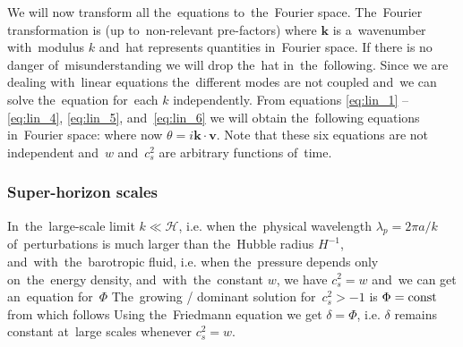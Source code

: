 We will now transform all the~equations to~the~Fourier space. The~Fourier transformation is (up to~non-relevant pre-factors)
where $\bm k$ is a~wavenumber with~modulus $k$ and~hat represents quantities in~Fourier space. If there is no danger of~misunderstanding we will drop the~hat in~the~following. Since we are dealing with~linear equations the~different modes are not coupled and~we can solve the~equation for~each $k$ independently.
 From equations \eqref{eq:lin_1} -- \eqref{eq:lin_4}, \eqref{eq:lin_5}, and~\eqref{eq:lin_6} we will obtain the~following equations in~Fourier space:
where now $\theta=i\bm{k\cdot  v}$. Note that these six equations are not independent and~$w$ and~$c_s^2$ are arbitrary functions of~time.
\subsubsection{Super-horizon scales}
In~the~large-scale limit $k\ll\mathcal{H}$, i.e. when the~physical wavelength $\lambda_p=2\pi a/k$ of~perturbations is much larger than the~Hubble radius $H^{-1}$, and~with~the~barotropic fluid, i.e. when the~pressure depends only on~the~energy density, and~with~the~constant $w$, we have $c_s^2=w$ and~we can get an~equation for~$\Phi$
The~growing / dominant solution for~$c_s^2>-1$ is $\Phi=\rm{const}$ from which follows
Using the~Friedmann equation we get $\delta=\Phi$, i.e. $\delta$ remains constant at~large scales whenever $c_s^2=w$.
